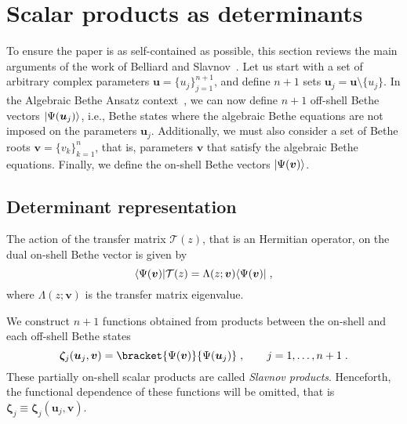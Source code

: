 \documentclass[a4paper,12pt]{amsart}
\begin{document}
\section{Scalar products as determinants}

To ensure the paper is as self-contained as possible, this section
reviews the main arguments of the work of Belliard and
Slavnov~\cite{Belliard:2019bfz}. Let us start with a set of arbitrary
complex parameters \(\bm{u} = \{u_j\}_{j=1}^{n+1}\), and define
\(n+1\) sets \(\bm{u}_j=\bm{u}\setminus \{u_j\}\). In the Algebraic
Bethe Ansatz context~\cite{Korepin:1993kvr, Slavnov:2019aba}, we can
now define \(n+1\) off-shell Bethe vectors \(\lvert\Psi(\bm{u}_j)\rangle\),
i.e., Bethe states where the algebraic Bethe equations are not imposed
on the parameters \(\bm{u}_j\). Additionally, we must also consider a
set of Bethe roots \(\bm{v} = \{ v_k \}_{k=1}^n\), that is, parameters
\(\bm{v}\) that satisfy the algebraic Bethe equations. Finally, we
define the on-shell Bethe vectors \(\lvert\Psi(\bm{v})\rangle\).

\subsection{Determinant representation}
The action of the transfer matrix \(\mathcal{T}(z)\), that is an
Hermitian operator, on the dual on-shell Bethe vector is given by
\begin{equation}
\label{eq:eigenvalue-bethe}
\langle\Psi(\bm{v})\rvert\mathcal{T}(z) = \Lambda(z; \bm{v}) \langle\Psi(\bm{v})\rvert \; , 
\end{equation}
where \(\Lambda(z; \bm{v}) \) is the transfer matrix eigenvalue.

We construct \(n+1\) functions obtained from products between the
on-shell and each off-shell Bethe states
\begin{equation}
  \bm{\zeta}_j(\bm{u}_j, \bm{v}) 
  = \bracket{\Psi(\bm{v})}{\Psi(\bm{u}_j)}\; ,\qquad j =1, \dots, n+1\; .
\end{equation}
These partially on-shell scalar products are called \emph{Slavnov
products}.  Henceforth, the functional dependence of these functions
will be omitted, that is \(\bm{\zeta}_j\equiv \bm{\zeta}_j(\bm{u}_j,
\bm{v})\).
\end{document}
